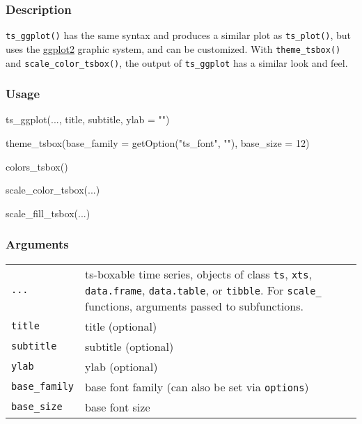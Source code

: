 \documentclass[
  letterpaper,
  DIV=11,
  numbers=noendperiod]{scrreport}
\newenvironment{Shaded}{\begin{snugshade}}{\end{snugshade}}
\newcommand{\AttributeTok}[1]{\textcolor[rgb]{0.40,0.45,0.13}{#1}}
\newcommand{\DecValTok}[1]{\textcolor[rgb]{0.68,0.00,0.00}{#1}}
\newcommand{\FunctionTok}[1]{\textcolor[rgb]{0.28,0.35,0.67}{#1}}
\newcommand{\NormalTok}[1]{\textcolor[rgb]{0.00,0.23,0.31}{#1}}
\newcommand{\StringTok}[1]{\textcolor[rgb]{0.13,0.47,0.30}{#1}}
\begin{document}
\subsubsection{Description}\label{description-60}

\texttt{ts\_ggplot()} has the same syntax and produces a similar plot as
\texttt{ts\_plot()}, but uses the
\href{https://ggplot2.tidyverse.org/}{ggplot2} graphic system, and can
be customized. With \texttt{theme\_tsbox()} and
\texttt{scale\_color\_tsbox()}, the output of \texttt{ts\_ggplot} has a
similar look and feel.

\subsubsection{Usage}\label{usage-60}

\begin{Shaded}
\begin{Highlighting}[]
\FunctionTok{ts\_ggplot}\NormalTok{(..., title, subtitle, }\AttributeTok{ylab =} \StringTok{""}\NormalTok{)}

\FunctionTok{theme\_tsbox}\NormalTok{(}\AttributeTok{base\_family =} \FunctionTok{getOption}\NormalTok{(}\StringTok{"ts\_font"}\NormalTok{, }\StringTok{""}\NormalTok{), }\AttributeTok{base\_size =} \DecValTok{12}\NormalTok{)}

\FunctionTok{colors\_tsbox}\NormalTok{()}

\FunctionTok{scale\_color\_tsbox}\NormalTok{(...)}

\FunctionTok{scale\_fill\_tsbox}\NormalTok{(...)}
\end{Highlighting}
\end{Shaded}

\subsubsection{Arguments}\label{arguments-60}

\begin{longtable}[]{@{}ll@{}}
\toprule\noalign{}
\endhead
\bottomrule\noalign{}
\endlastfoot
\texttt{...} & ts-boxable time series, objects of class \texttt{ts},
\texttt{xts}, \texttt{data.frame}, \texttt{data.table}, or
\texttt{tibble}. For \texttt{scale\_} functions, arguments passed to
subfunctions. \\
\texttt{title} & title (optional) \\
\texttt{subtitle} & subtitle (optional) \\
\texttt{ylab} & ylab (optional) \\
\texttt{base\_family} & base font family (can also be set via
\texttt{options}) \\
\texttt{base\_size} & base font size \\
\end{longtable}
\end{document}
